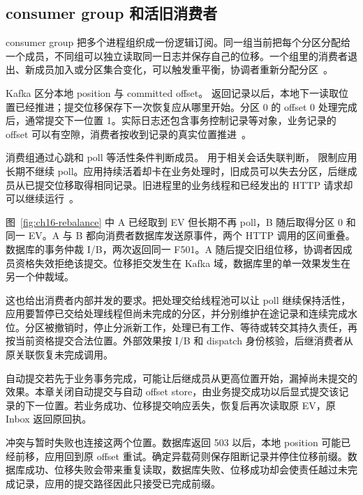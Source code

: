 \subsection{consumer group 和活旧消费者}

consumer group 把多个进程组织成一份逻辑订阅。同一组当前把每个分区分配给一个成员，不同组可以独立读取同一日志并保存自己的位移。一个组里的消费者退出、新成员加入或分区集合变化，可以触发重平衡，协调者重新分配分区~\cite{kafka44-consumer}。

Kafka 区分本地 position 与 committed offset。 返回记录以后，本地下一读取位置已经推进；提交位移保存下一次恢复应从哪里开始。分区 0 的 offset 0 处理完成后，通常提交下一位置 1。实际日志还包含事务控制记录等对象，业务记录的 offset 可以有空隙，消费者按收到记录的真实位置推进~\cite{kafka44-consumer}。

消费组通过心跳和 poll 等活性条件判断成员。 用于相关会话失联判断， 限制应用长期不继续 poll。应用持续活着却卡在业务处理时，旧成员可以失去分区，后继成员从已提交位移取得相同记录。旧进程里的业务线程和已经发出的 HTTP 请求却可以继续运行~\cite{kafka44-consumer}。


图~\ref{fig:ch16-rebalance} 中 A 已经取到 EV 但长期不再 poll，B 随后取得分区 0 和同一 EV。A 与 B 都向消费者数据库发送原事件，两个 HTTP 调用的区间重叠。数据库的事务仲裁 I/B，两次返回同一 F501。A 随后提交旧组位移，协调者因成员资格失效拒绝该提交。位移拒交发生在 Kafka 域，数据库里的单一效果发生在另一个仲裁域。

这也给出消费者内部并发的要求。把处理交给线程池可以让 poll 继续保持活性，应用要暂停已交给处理线程但尚未完成的分区，并分别维护在途记录和连续完成水位。分区被撤销时，停止分派新工作，处理已有工作、等待或转交其持久责任，再按当前资格提交合法位置。外部效果按 I/B 和 dispatch 身份核验，后继消费者从原关联恢复未完成调用。

自动提交若先于业务事务完成，可能让后继成员从更高位置开始，漏掉尚未提交的效果。本章关闭自动提交与自动 offset store，由业务提交成功以后显式提交该记录的下一位置。若业务成功、位移提交响应丢失，恢复后再次读取原 EV，原 Inbox 返回原回执。

冲突与暂时失败也连接这两个位置。数据库返回 503 以后，本地 position 可能已经前移，应用回到原 offset 重试。确定异载荷则保存阻断记录并停住位移前缀。数据库成功、位移失败会带来重复读取，数据库失败、位移成功却会使责任越过未完成记录，应用的提交路径因此只接受已完成前缀。


